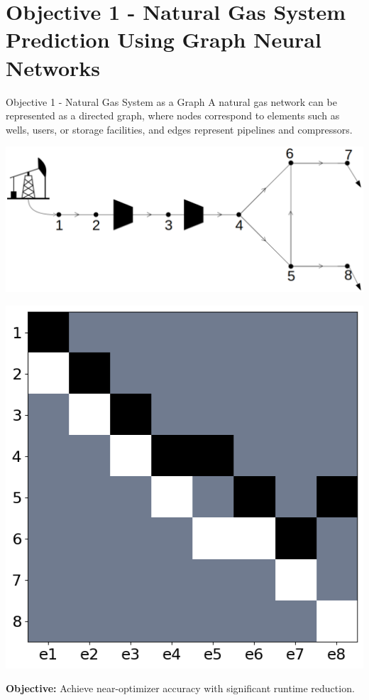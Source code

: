 \documentclass[hyperref={colorlinks,citecolor=blue,linkcolor=blue,urlcolor=blue}]{beamer}
\begin{document}
\section{Objective 1 - Natural Gas System Prediction Using Graph Neural Networks}
\begin{frame}{Objective 1 - Natural Gas System as a Graph}
    \footnotesize
    \justifying
    A natural gas network can be represented as a directed graph, 
    where nodes correspond to elements such as wells, users, or storage facilities, 
    and edges represent pipelines and compressors.
    
    \begin{minipage}[c]{0.48\linewidth}
        \centering
        \includegraphics[width=1\linewidth]{figures/8_node_system.png} 
    \end{minipage}\hfill
    \begin{minipage}[c]{0.48\linewidth}
        \centering
        \includegraphics[width=0.65\linewidth]{figures/incidence_matrix.png} 
    \end{minipage}
    
    \vspace{0.3cm}
    \textbf{Objective:} Achieve near-optimizer accuracy with significant runtime reduction.
\end{frame}
\end{document}
